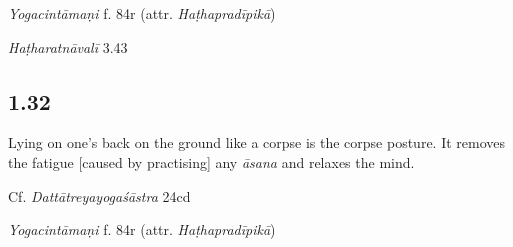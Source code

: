\begin{ekdosis}
\begin{testimonia}[hp01_031]
\emph{Yogacintāmaṇi} f. 84r (attr. \emph{Haṭhapradīpikā})

\begin{versinnote}
\end{versinnote}

\emph{Haṭharatnāvalī} 3.43

\begin{versinnote}
\end{versinnote}

\end{testimonia}


\subsection*{1.32}
\begin{translation}[hp01_032]
Lying on one's back on the ground like a corpse is the corpse posture. It removes the fatigue [caused by practising] any \emph{āsana} and relaxes the mind.
\end{translation}

\begin{sources}[hp01_032]
Cf. \emph{Dattātreyayogaśāstra} 24cd

\begin{versinnote}
\end{versinnote}

\end{sources}

\begin{testimonia}[hp01_032]
\emph{Yogacintāmaṇi} f. 84r (attr. \emph{Haṭhapradīpikā})


\end{testimonia}
\end{ekdosis}
